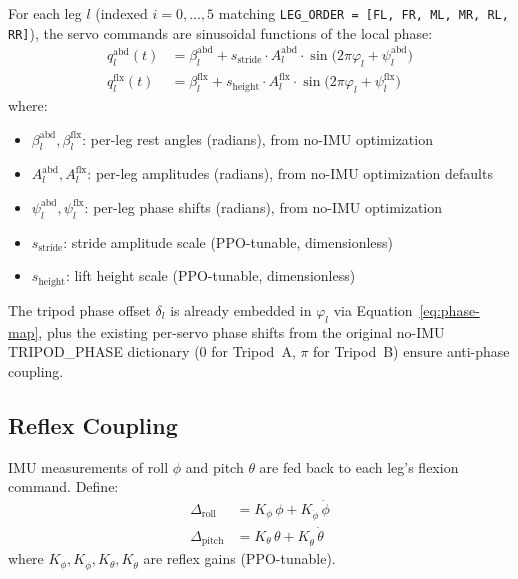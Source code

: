 \documentclass[11pt]{article}
\begin{document}
For each leg $l$ (indexed $i=0,\ldots,5$ matching \texttt{LEG\_ORDER = [FL, FR, ML, MR, RL, RR]}), the servo commands are sinusoidal functions of the local phase:
\begin{align}
q_l^{\mathrm{abd}}(t) &= \beta_l^{\mathrm{abd}} + s_{\mathrm{stride}} \cdot A_l^{\mathrm{abd}} \cdot \sin\!\bigl(2\pi\varphi_l + \psi_l^{\mathrm{abd}}\bigr) \label{eq:abd-cmd} \\
q_l^{\mathrm{flx}}(t) &= \beta_l^{\mathrm{flx}} + s_{\mathrm{height}} \cdot A_l^{\mathrm{flx}} \cdot \sin\!\bigl(2\pi\varphi_l + \psi_l^{\mathrm{flx}}\bigr) \label{eq:flx-cmd}
\end{align}
where:
\begin{itemize}
    \item $\beta_l^{\mathrm{abd}}, \beta_l^{\mathrm{flx}}$: per-leg rest angles (radians), from no-IMU optimization
    \item $A_l^{\mathrm{abd}}, A_l^{\mathrm{flx}}$: per-leg amplitudes (radians), from no-IMU optimization defaults
    \item $\psi_l^{\mathrm{abd}}, \psi_l^{\mathrm{flx}}$: per-leg phase shifts (radians), from no-IMU optimization
    \item $s_{\mathrm{stride}}$: stride amplitude scale (PPO-tunable, dimensionless)
    \item $s_{\mathrm{height}}$: lift height scale (PPO-tunable, dimensionless)
\end{itemize}

The tripod phase offset $\delta_l$ is already embedded in $\varphi_l$ via Equation~\eqref{eq:phase-map}, plus the existing per-servo phase shifts from the original no-IMU TRIPOD\_PHASE dictionary ($0$ for Tripod~A, $\pi$ for Tripod~B) ensure anti-phase coupling.

\subsection{Reflex Coupling}
\label{sec:reflex}

IMU measurements of roll $\phi$ and pitch $\theta$ are fed back to each leg's flexion command. Define:
\begin{align}
\Delta_{\mathrm{roll}} &= K_\phi\,\phi + K_{\dot\phi}\,\dot\phi \label{eq:reflex-roll} \\
\Delta_{\mathrm{pitch}} &= K_\theta\,\theta + K_{\dot\theta}\,\dot\theta \label{eq:reflex-pitch}
\end{align}
where $K_\phi, K_{\dot\phi}, K_\theta, K_{\dot\theta}$ are reflex gains (PPO-tunable).
\end{document}
